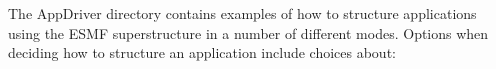 %


The AppDriver directory contains examples of how to structure 
applications using the ESMF superstructure in a number of different
modes.  Options when deciding how to structure an application 
include choices about:

